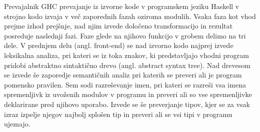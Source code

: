 Prevajalnik GHC prevajanje iz izvorne kode v programskem jeziku Haskell v strojno kodo izvaja v več zaporednih fazah oziroma modulih. Vsaka faza kot vhod prejme izhod prejšnje, nad njim izvede določeno transformacijo in rezultat posreduje naslednji fazi. Faze glede na njihovo funkcijo v grobem delimo na tri dele. V prednjem delu (angl. front-end) se nad izvorno kodo najprej izvede leksikalna analiza, pri kateri se iz toka znakov, ki predstavljajo vhodni program pridobi abstraktno sintaktično drevo (angl. abstract syntax tree). Nad drevesom se izvede še zaporedje semantičnih analiz pri katerih se preveri ali je program pomensko pravilen. Sem sodi razreševanje imen, pri kateri se razreši vsa imena spremenljivk iz uvoženih modulov v programu in preveri ali so vse spremenljivke deklarirane pred njihovo uporabo. Izvede se še preverjanje tipov, kjer se za vsak izraz izpelje njegov najbolj splošen tip in preveri ali se vsi tipi v programu ujemajo.

